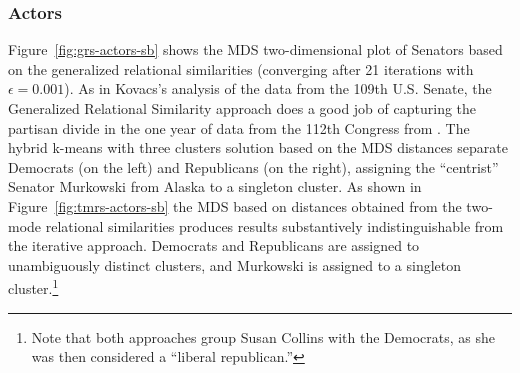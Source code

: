 \documentclass[a4paper,fleqn]{cas-sc}
\begin{document}
\subsubsection{Actors}
Figure~\ref{fig:grs-actors-sb} shows the MDS two-dimensional plot of Senators based on the generalized relational similarities (converging after 21 iterations with $\epsilon = 0.001$). As in Kovacs's analysis of the data from the 109th U.S. Senate, the Generalized Relational Similarity approach does a good job of capturing the partisan divide in the one year of data from the 112th Congress from \citet{knoke2021multimodal}. The hybrid k-means with three clusters solution based on the MDS distances separate Democrats (on the left) and Republicans (on the right), assigning the ``centrist'' Senator Murkowski from Alaska to a singleton cluster. As shown in Figure~\ref{fig:tmrs-actors-sb} the MDS based on distances obtained from the two-mode relational similarities produces results substantively indistinguishable from the iterative approach. Democrats and Republicans are assigned to unambiguously distinct clusters, and Murkowski is assigned to a singleton cluster.\footnote{Note that both approaches group Susan Collins with the Democrats, as she was then considered a ``liberal republican.''}
\end{document}
